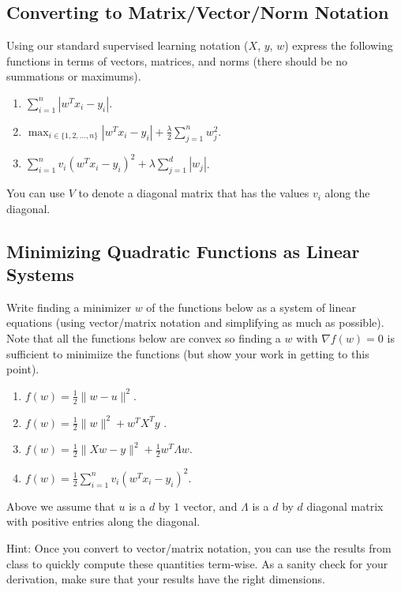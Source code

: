 \documentclass{article}
\def\blu#1{{\color{blu}#1}}
\def\norm#1{\|#1\|}
\def\enum#1{\begin{enumerate}#1\end{enumerate}}
\begin{document}
\subsection{Converting to Matrix/Vector/Norm Notation}

Using our standard supervised learning notation ($X$, $y$, $w$)
express the following functions in terms of vectors, matrices, and norms (there should be no summations or maximums).
\blu{\enum{
\item $\sum_{i=1}^n |w^Tx_i - y_i|$.
\item $\max_{i \in \{1,2,\dots,n\}} |w^Tx_i  - y_i| + \frac{\lambda}{2}\sum_{j=1}^n w_j^2$.
\item $\sum_{i=1}^n v_i (w^Tx_i - y_i)^2 + \lambda \sum_{j=1}^{d} |w_j|$.
}}
You can use $V$ to denote a diagonal matrix that has the values $v_i$ along the diagonal.



\subsection{Minimizing Quadratic Functions as Linear Systems}

Write finding a minimizer $w$ of the functions below as a system of linear equations (using vector/matrix notation and simplifying as much as possible). Note that all the functions below are convex  so finding a $w$ with $\nabla f(w) = 0$ is sufficient to minimiize the functions (but show your work in getting to this point).
\blu{\enum{
\item $f(w) = \frac{1}{2}\norm{w-u}^2$.
\item $f(w) = \frac{1}{2}\norm{w}^2 + w^TX^Ty$ .
\item $f(w)= \frac{1}{2}\norm{Xw - y}^2 + \frac{1}{2}w^T\Lambda w$.
\item $f(w) = \frac{1}{2}\sum_{i=1}^n v_i (w^Tx_i - y_i)^2$.
}}
Above we assume that $u$ is a $d$ by $1$ vector, and $\Lambda$ is a $d$ by $d$ diagonal matrix with positive entries along the diagonal.

Hint: Once you convert to vector/matrix notation, you can use the results from class to quickly compute these quantities term-wise. As a sanity check for your derivation, make sure that your results have the right dimensions.



\end{document}
